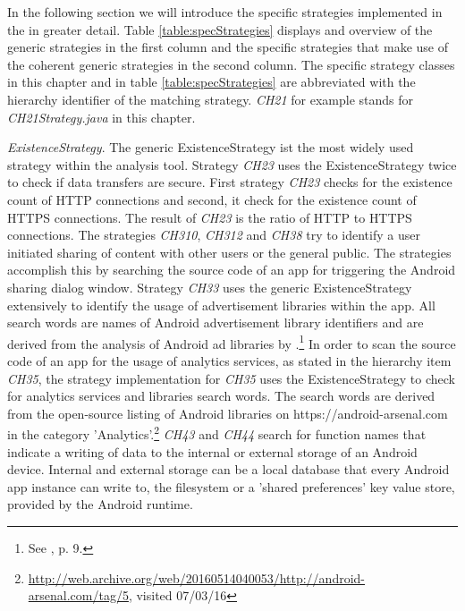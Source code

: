In the following section we will introduce the specific strategies implemented in the \aiprat in greater detail.
Table \ref{table:specStrategies} displays and overview of the generic strategies in the first column and the specific strategies that make use of the coherent generic strategies in the second column.
The specific strategy classes in this chapter and in table \ref{table:specStrategies} are abbreviated with the \ipp hierarchy identifier of the matching strategy. 
\textit{CH21} for example stands for \textit{CH21\textunderscore Strategy.java} in this chapter.

\textit{ExistenceStrategy}.
The generic ExistenceStrategy ist the most widely used strategy within the analysis tool.
Strategy \textit{CH23} uses the ExistenceStrategy twice to check if data transfers are secure. 
First strategy \textit{CH23} checks for the existence count of HTTP connections and second, it check for the existence count of HTTPS connections.
The result of \textit{CH23} is the ratio of \acs{HTTP} to \acs{HTTPS} connections.
The strategies \textit{CH310}, \textit{CH312} and \textit{CH38} try to identify a user initiated sharing of content with other users or the general public.
The strategies accomplish this by searching the source code of an app for triggering the Android sharing dialog window.
Strategy \textit{CH33} uses the generic ExistenceStrategy extensively to identify the usage of advertisement libraries within the app.
All search words are names of Android advertisement library identifiers and are derived from the analysis of Android ad libraries by \cite{Book2013}.\footnote{See \cite{Book2013}, p. 9.}
In order to scan the source code of an app for the usage of analytics services, as stated in the hierarchy item \textit{CH35}, the strategy implementation for \textit{CH35} uses the ExistenceStrategy to check for analytics services and libraries search words.
The search words are derived from the open-source listing of Android libraries on https://android-arsenal.com in the category 'Analytics'.\footnote{\url{http://web.archive.org/web/20160514040053/http://android-arsenal.com/tag/5}, visited 07/03/16}
\textit{CH43} and \textit{CH44} search for function names that indicate a writing of data to the internal or external storage of an Android device.
Internal and external storage can be a local database that every Android app instance can write to, the filesystem or a 'shared preferences' key value store, provided by the Android runtime.
